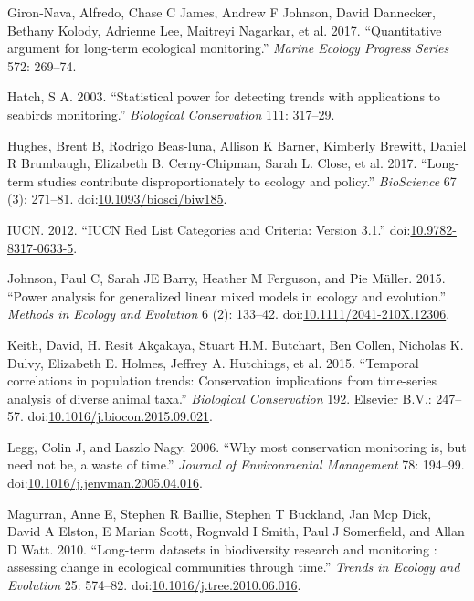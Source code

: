 \documentclass[12pt,]{article}
\begin{document}
\hypertarget{ref-Giron-Nava2017}{}
Giron-Nava, Alfredo, Chase C James, Andrew F Johnson, David Dannecker,
Bethany Kolody, Adrienne Lee, Maitreyi Nagarkar, et al. 2017.
``Quantitative argument for long-term ecological monitoring.''
\emph{Marine Ecology Progress Series} 572: 269--74.

\hypertarget{ref-Hatch2003}{}
Hatch, S A. 2003. ``Statistical power for detecting trends with
applications to seabirds monitoring.'' \emph{Biological Conservation}
111: 317--29.

\hypertarget{ref-Hughes2017}{}
Hughes, Brent B, Rodrigo Beas-luna, Allison K Barner, Kimberly Brewitt,
Daniel R Brumbaugh, Elizabeth B. Cerny-Chipman, Sarah L. Close, et al.
2017. ``Long-term studies contribute disproportionately to ecology and
policy.'' \emph{BioScience} 67 (3): 271--81.
doi:\href{https://doi.org/10.1093/biosci/biw185}{10.1093/biosci/biw185}.

\hypertarget{ref-IUCN2012}{}
IUCN. 2012. ``IUCN Red List Categories and Criteria: Version 3.1.''
doi:\href{https://doi.org/10.9782-8317-0633-5}{10.9782-8317-0633-5}.

\hypertarget{ref-Johnson2015}{}
Johnson, Paul C, Sarah JE Barry, Heather M Ferguson, and Pie Müller.
2015. ``Power analysis for generalized linear mixed models in ecology
and evolution.'' \emph{Methods in Ecology and Evolution} 6 (2): 133--42.
doi:\href{https://doi.org/10.1111/2041-210X.12306}{10.1111/2041-210X.12306}.

\hypertarget{ref-Keith2015}{}
Keith, David, H. Resit Akçakaya, Stuart H.M. Butchart, Ben Collen,
Nicholas K. Dulvy, Elizabeth E. Holmes, Jeffrey A. Hutchings, et al.
2015. ``Temporal correlations in population trends: Conservation
implications from time-series analysis of diverse animal taxa.''
\emph{Biological Conservation} 192. Elsevier B.V.: 247--57.
doi:\href{https://doi.org/10.1016/j.biocon.2015.09.021}{10.1016/j.biocon.2015.09.021}.

\hypertarget{ref-Legg2006}{}
Legg, Colin J, and Laszlo Nagy. 2006. ``Why most conservation monitoring
is, but need not be, a waste of time.'' \emph{Journal of Environmental
Management} 78: 194--99.
doi:\href{https://doi.org/10.1016/j.jenvman.2005.04.016}{10.1016/j.jenvman.2005.04.016}.

\hypertarget{ref-Magurran2010}{}
Magurran, Anne E, Stephen R Baillie, Stephen T Buckland, Jan Mcp Dick,
David A Elston, E Marian Scott, Rognvald I Smith, Paul J Somerfield, and
Allan D Watt. 2010. ``Long-term datasets in biodiversity research and
monitoring : assessing change in ecological communities through time.''
\emph{Trends in Ecology and Evolution} 25: 574--82.
doi:\href{https://doi.org/10.1016/j.tree.2010.06.016}{10.1016/j.tree.2010.06.016}.
\end{document}
